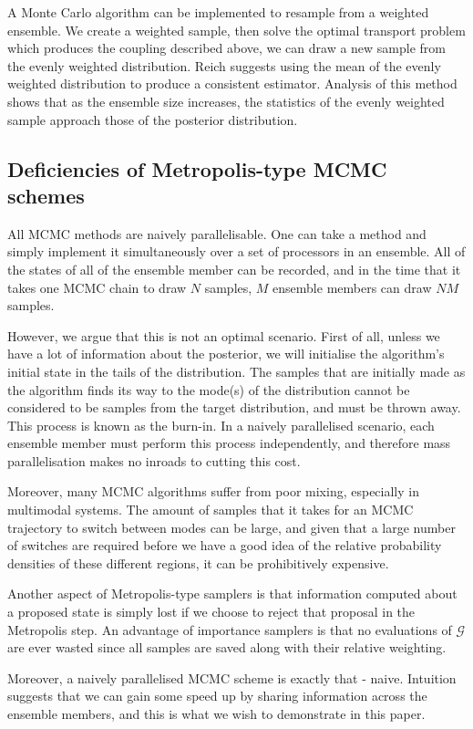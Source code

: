\documentclass[final]{siamltex}
\begin{document}
A Monte Carlo algorithm can be implemented to resample from a weighted
ensemble. We create a weighted sample, then solve the optimal
transport problem which produces the coupling described above, we can
draw a new sample from the evenly weighted distribution. Reich
suggests using the mean of the evenly weighted distribution to produce
a consistent estimator. Analysis of this method shows that as the
ensemble size increases, the statistics of the evenly weighted sample
approach those of the posterior distribution.

\subsection{Deficiencies of Metropolis-type MCMC schemes}
All MCMC methods are naively parallelisable. One can take a method
and simply implement it simultaneously over a set of processors in an ensemble. All
of the states of all of the ensemble member can be recorded, and in the time
that it takes one MCMC chain to draw $N$ samples, $M$ ensemble members
can draw $NM$ samples. 

However, we argue that this is not an optimal
scenario. First of all, unless we have a lot of information about the
posterior, we will initialise the algorithm's initial state in the
tails of the distribution. The samples that are initially made as the
algorithm finds its way to the mode(s) of the distribution cannot be
considered to be samples from the target distribution, and must be thrown
away. This process is known as the burn-in. In a naively parallelised
scenario, each ensemble member must perform this process independently,
and therefore mass parallelisation makes no inroads to cutting this cost.

Moreover, many MCMC algorithms suffer from poor mixing, especially in
multimodal systems. The amount of samples that it takes for an MCMC
trajectory to switch between modes can be large, and given that a large
number of switches are required before we have a good idea of the relative
probability densities of these different regions, it can be prohibitively
expensive.

Another aspect of Metropolis-type samplers is that information
computed about a proposed state is simply lost if we choose to reject
that proposal in the Metropolis step. An advantage of importance
samplers is that no evaluations of $\mathcal{G}$ are ever wasted
since all samples are saved along with their relative weighting.

Moreover, a naively parallelised MCMC scheme is exactly that -
naive. Intuition suggests that we can gain some speed up by sharing
information across the ensemble members, and this is
what we wish to demonstrate in this paper.
\end{document}
